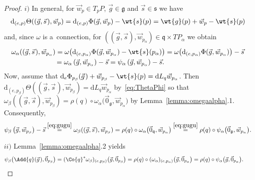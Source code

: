 \begin{proof}
$i)$ In general, for $\vec{w}_p\in T_pP$, $\vec{g}\in\mathfrak{g}$ and $\vec{s}\in\mathfrak{s}$ we have
\begin{gather}
\label{eq:ThetaPhi}
\mathrm{d}_{(e,p)}\Theta((\vec{g},\vec{s}\hspace{1pt}),\vec{w}_p)
=\mathrm{d}_{(e,p)}\Phi(\vec{g},\vec{w}_p)-\wt{s}(p)=\wt{g}(p)+\vec{w}_p-\wt{s}(p)
\end{gather}
and, since $\omega$ is a~connection, for $((\vec{g},\vec{s}),\vec{w}_{p_\alpha})\in \mathfrak{q}\times TP_\alpha$ we
obtain{\samepage
\begin{gather}
\begin{split}
& \omega_\alpha((\vec{g},\vec{s}\hspace{1pt}),\vec{w}_{p_\alpha})
=\omega\big(\mathrm{d}_{(e,p_\alpha)}\Phi(\vec{g},\vec{w}_{p_\alpha})-\wt{s}(p_\alpha)\big)
=\omega\big(\mathrm{d}_{(e,p_\alpha)}\Phi(\vec{g},\vec{w}_{p_\alpha})\big)-\vec{s}
\\
&\phantom{\omega_\alpha((\vec{g},\vec{s}),\vec{w}_{p_\alpha})}
=\omega_\alpha\left(\vec{g},\vec{w}_{p_\alpha}\right)-\vec{s}
=\psi_\alpha\left(\vec{g},\vec{w}_{p_\alpha}\right)-\vec{s}.
\end{split} \label{eq:gugu}
\end{gather}
Now,} assume that $\mathrm{d}_e\Phi_{p_\beta}(\vec{g}\hspace{1pt})+\vec{w}_{p_\beta}-\wt{s}(p)=\mathrm{d}
L_q\vec{w}_{p_\alpha}$.
Then $\mathrm{d}_{(e,p_\beta)}\Theta((\vec{g},\vec{s}\hspace{1pt}),\vec{w}_{p_\beta})=\mathrm{d} L_q \vec{w}_{p_\alpha}$
by~\eqref{eq:ThetaPhi} so that $\omega_\beta((\vec{g},\vec{s}),\vec{w}_{p_\beta})=\rho(q)\circ
\omega_\alpha\big(\vec{0}_{\mathfrak{g}},\vec{w}_{p_\alpha}\big)$ by Lemma~\ref{lemma:omegaalpha}.1.
Consequently,
\begin{gather*}
\psi_\beta\left(\vec{g},\vec{w}_{p_\beta}\right)-\vec{s}
\stackrel{\eqref{eq:gugu}}{=}\omega_\beta((\vec{g},\vec{s}\hspace{1pt}),\vec{w}_{p_\beta})
=\rho(q)\circ
\omega_\alpha\big(\vec{0}_\mathfrak{q},\vec{w}_{p_\alpha}\big)\stackrel{\eqref{eq:gugu}}{=}\rho(q)\circ
\psi_\alpha\big(\vec{0}_{\mathfrak{g}},\vec{w}_{p_\alpha}\big).
\end{gather*}

$ii)$ Lemma~\ref{lemma:omegaalpha}.2 yields
\begin{gather*}
\psi_\beta\big(\Add{q}(\vec{g}\hspace{1pt}),\vec{0}_{p_\beta}\big)
=(\Co{q}^{*}\omega_\beta)_{(e,p_\beta)}\big(\vec{g},\vec{0}_{p_\beta}\big)
=\rho(q)\circ (\omega_\alpha)_{(e,p_\alpha)}\big(\vec{g},\vec{0}_{p_\alpha}\big) =\rho(q)\circ
\psi_\alpha\big(\vec{g},\vec{0}_{p_\alpha}\big).\!\!\!\!\tag*{\qed}
\end{gather*}
\renewcommand{\qed}{}
\end{proof}


